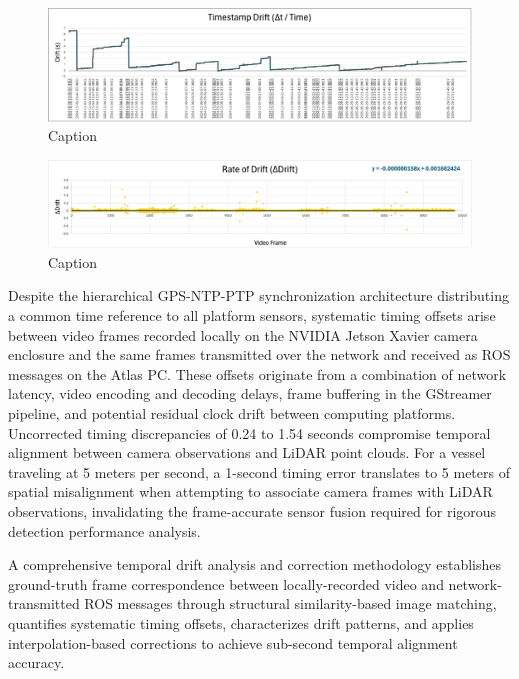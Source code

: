 \documentclass{erauthesis}
\begin{document}
\begin{figure}[htbp]
    \centering
    \includegraphics[width=0.98\linewidth]{Images/temporal_drift.png}
    \caption{Caption}
    \label{fig:drift}
\end{figure}

\begin{figure}[htbp]
    \centering
    \includegraphics[width=0.98\linewidth]{Images/temporal_drift_rate.png}
    \caption{Caption}
    \label{fig:drift_rate}
\end{figure}




Despite the hierarchical GPS-NTP-PTP synchronization architecture distributing a common time reference to all platform sensors, systematic timing offsets arise between video frames recorded locally on the NVIDIA Jetson Xavier camera enclosure and the same frames transmitted over the network and received as ROS messages on the Atlas PC.
These offsets originate from a combination of network latency, video encoding and decoding delays, frame buffering in the GStreamer pipeline, and potential residual clock drift between computing platforms.
Uncorrected timing discrepancies of 0.24 to 1.54 seconds compromise temporal alignment between camera observations and LiDAR point clouds.
For a vessel traveling at 5 meters per second, a 1-second timing error translates to 5 meters of spatial misalignment when attempting to associate camera frames with LiDAR observations, invalidating the frame-accurate sensor fusion required for rigorous detection performance analysis.

A comprehensive temporal drift analysis and correction methodology establishes ground-truth frame correspondence between locally-recorded video and network-transmitted ROS messages through structural similarity-based image matching, quantifies systematic timing offsets, characterizes drift patterns, and applies interpolation-based corrections to achieve sub-second temporal alignment accuracy.
\end{document}
